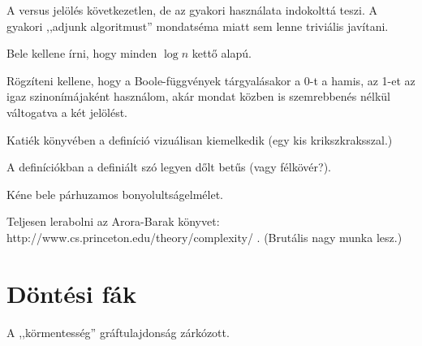 A \LOGSPACE versus \NL jelölés következetlen, de az \Language gyakori használata indokolttá teszi. A gyakori ,,adjunk \LOGSPACE algoritmust'' mondatséma miatt sem lenne triviális javítani.

Bele kellene írni, hogy minden $\log n$ kettő alapú.

Rögzíteni kellene, hogy a Boole-függvények tárgyalásakor a 0-t a hamis, az 1-et az igaz szinonímájaként használom, akár mondat közben is szemrebbenés nélkül váltogatva a két jelölést.

Katiék könyvében a definíció vizuálisan kiemelkedik (egy kis krikszkraksszal.)

A definíciókban a definiált szó legyen dőlt betűs (vagy félkövér?).

Kéne bele párhuzamos bonyolultságelmélet.

Teljesen lerabolni az Arora-Barak könyvet: http://www.cs.princeton.edu/theory/complexity/ . (Brutális nagy munka lesz.)


\chapter{Döntési fák}

\begin{Exercise}[counter={sorszam}, difficulty=0]
A ,,körmentesség'' gráftulajdonság zárkózott. 



\end{Exercise}

